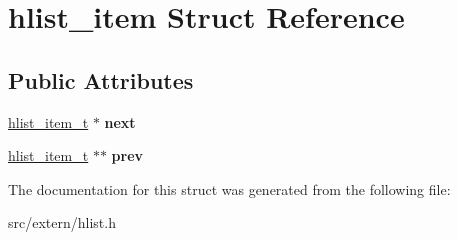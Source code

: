 \hypertarget{structhlist__item}{\section{hlist\+\_\+item Struct Reference}
\label{structhlist__item}
}
\subsection*{Public Attributes}
\begin{DoxyCompactItemize}
\item 
\hypertarget{structhlist__item_a0b5816d4103b21452ca6bbb1d037b5c9}{\hyperlink{structhlist__item}{hlist\+\_\+item\+\_\+t} $\ast$ {\bfseries next}}\label{structhlist__item_a0b5816d4103b21452ca6bbb1d037b5c9}

\item 
\hypertarget{structhlist__item_a9f5be49ad861d3573c7c68067500c7ad}{\hyperlink{structhlist__item}{hlist\+\_\+item\+\_\+t} $\ast$$\ast$ {\bfseries prev}}\label{structhlist__item_a9f5be49ad861d3573c7c68067500c7ad}

\end{DoxyCompactItemize}


The documentation for this struct was generated from the following file\+:\begin{DoxyCompactItemize}
\item 
src/extern/hlist.\+h\end{DoxyCompactItemize}
